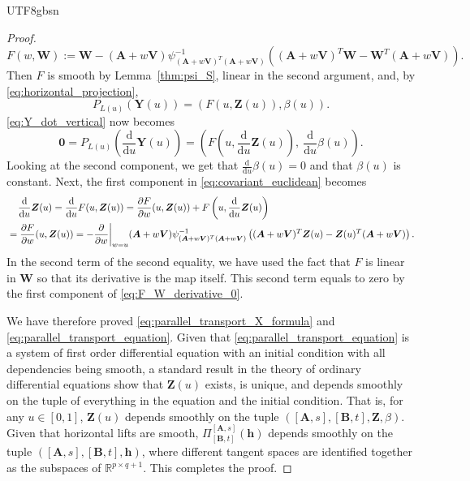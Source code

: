 \documentclass[12pt]{report}
\newcommand\tab[1][1cm]{\hspace*{#1}}
\newcommand{\bracket}[1]{\left ( #1 \right )}
\theoremstyle{plain}
\theoremstyle{definition}
\begin{document}
\begin{CJK*}{UTF8}{gbsn}
\begin{proof}
\begin{equation*}
F(w, \bm{W}) := \bm{W} - (\bm{A}+w\bm{V})\psi^{-1}_{(\bm{A}+w\bm{V})^T(\bm{A}+w\bm{V})}
\bracket{(\bm{A}+w\bm{V})^T\bm{W} - \bm{W}^T(\bm{A}+w\bm{V})}.
\end{equation*}
Then $F$ is smooth by Lemma~\ref{thm:psi_S},
linear in the second argument,
and, by
\eqref{eq:horizontal_projection},
\begin{equation*}
P_{L(u)}(\bm{Y}(u)) = (F(u, \bm{Z}(u)), \beta(u)).
\end{equation*}
\eqref{eq:Y_dot_vertical} now becomes
\begin{equation}\label{eq:F_W_derivative_0}
  \bm{0}
  = P_{L(u)}\bracket{\frac{\mathrm{d}}{\mathrm{d} u}\bm{Y}(u)}
  = \bracket{F\bracket{u, \frac{\mathrm{d}}{\mathrm{d} u}\bm{Z}(u)},\
    \frac{\mathrm{d}}{\mathrm{d} u}\beta(u)}.
\end{equation}
Looking at the second component, 
we get that $\frac{\mathrm{d}}{\mathrm{d} u}\beta(u) = 0$
and that $\beta(u)$ is constant.
Next, the first component in \eqref{eq:covariant_euclidean}
becomes 
\begin{equation*}
  \begin{split}
  & \tab[0.4cm] \frac{\mathrm{d}}{\mathrm{d} u} \bm{Z}(u)
  = \frac{\mathrm{d}}{\mathrm{d} u} F(u, \bm{Z}(u))
  = \frac{\partial F}{\partial w}(u, \bm{Z}(u))
  + F\bracket{u, \frac{\mathrm{d}}{\mathrm{d} u}\bm{Z}(u)}
  \\ & = \frac{\partial F}{\partial w}(u, \bm{Z}(u))
  = - \frac{\partial}{\partial w}\biggr |_{w=u} 
  (\bm{A}+w\bm{V})\psi^{-1}_{(\bm{A}+w\bm{V})^T(\bm{A}+w\bm{V})}
\bracket{(\bm{A}+w\bm{V})^T\bm{Z}(u) - \bm{Z}(u)^T(\bm{A}+w\bm{V})}.
  \end{split}
\end{equation*}
In the second term of the second equality, 
we have used the fact that $F$ is linear in $\bm{W}$
so that its derivative is the map itself.
This second term equals to zero
by the first component of \eqref{eq:F_W_derivative_0}.

We have therefore proved \eqref{eq:parallel_transport_X_formula} 
and \eqref{eq:parallel_transport_equation}.
Given that \eqref{eq:parallel_transport_equation} 
is a system of first order differential equation with an 
initial condition with all dependencies 
being smooth,
a standard result in the theory of ordinary 
differential equations show that 
$\bm{Z}(u)$ exists, is unique, and depends smoothly 
on the tuple of everything in the equation and the initial condition.
That is, for any $u \in [0,1]$, 
$\bm{Z}(u)$ depends smoothly on 
the tuple $([\bm{A},s], [\bm{B},t], \bm{Z}, \beta)$.
Given that horizontal lifts are smooth,
$\Pi_{[\bm{B}, t]}^{[\bm{A},s]}(\bm{h})$ depends smoothly on 
the tuple $([\bm{A},s], [\bm{B}, t], \bm{h})$,
where different tangent spaces are identified together 
as the subspaces of $\mathbb{R}^{p \times q + 1}$.
This completes the proof.
\end{proof}


\end{CJK*}
\end{document}
